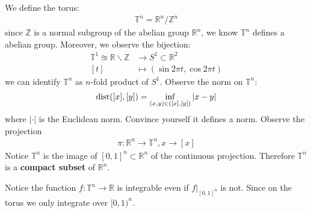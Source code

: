 We define the torus:
\begin{align*}
	\mathbb{T}^n =  \mathbb{R}^n \slash \mathbb{Z}^n
\end{align*}
since $\mathbb{Z}$ is a normal subgroup of the abelian group $\mathbb{R}^n$, we know $\mathbb{T}^n$ defines a abelian group. Moreover, we observe the bijection:
\begin{align*}
	 \mathbb{T}^1 \approxeq \mathbb{R} \backslash \mathbb{Z} &\rightarrow S^1 \subset {\mathbb{R}^2}\\
	 [t] & \mapsto (\sin2 \pi t, \cos 2\pi t) 
\end{align*}
we can identify $\mathbb{T}^n$ as $n$-fold product of $S^1$. Observe the norm on $\mathbb{T}^n$:
	\begin{align*}
		\operatorname*{dist}([x], [y]) = \inf_{(x, y)\in ([x], [y])} |x - y|
	\end{align*}
	where $|\cdot|$ is the Euclidean norm. Convince yourself it defines a norm. Observe the projection
	\begin{align*}
		\pi: \mathbb{R}^n \rightarrow \mathbb{T}^n, x \rightarrow [x]
	\end{align*}
	Notice $\mathbb{T}^n$ is the image of $[0, 1]^n \subset \mathbb{R}^n$ of the continuous projection. Therefore $\mathbb{T}^n$ is a \textbf{compact subset} of $\mathbb{R}^n$. \par 
	
\begin{remark}
Notice the function $f: \mathbb{T}^n \rightarrow \mathbb{R}$ is integrable even if $f |_{[0, 1]^n}$ is not. Since on the torus we only integrate over $[0, 1)^n$. 
\end{remark}


